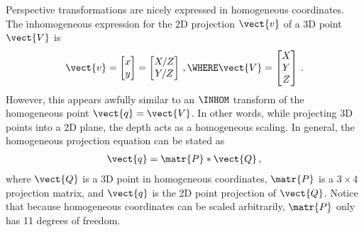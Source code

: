 \documentclass[oneandhalfcolumn]{coursenotes-handout}
\begin{document}
Perspective transformations are nicely expressed in homogeneous coordinates. The inhomogeneous expression for the 2D projection \(\vect{v}\) of a 3D point \(\vect{V}\) is
\begin{align}
\vect{v} = \begin{bmatrix}x \\ y\end{bmatrix} = \begin{bmatrix}X / Z \\ Y / Z\end{bmatrix} \,, \WHERE
\vect{V} = \begin{bmatrix}X \\ Y \\ Z\end{bmatrix} \,.
\end{align}
However, this appears awfully similar to an \(\INHOM\) transform of the homogeneous point \(\vect{q} = \vect{V}\). In other words, while projecting 3D points into a 2D plane, the depth acts as a homogeneous scaling. In general, the homogeneous projection equation can be stated as
\begin{align}
  \vect{q} = \matr{P} * \vect{Q} \,,
\end{align}
where \(\vect{Q}\) is a 3D point in homogeneous coordinates, \(\matr{P}\) is a \(3\times4\) projection matrix, and \(\vect{q}\) is the 2D point projection of \(\vect{Q}\). Notice that because homogeneous coordinates can be scaled arbitrarily, \(\matr{P}\) only has 11 degrees of freedom.

\begin{exercises}

\end{exercises}

\end{document}
